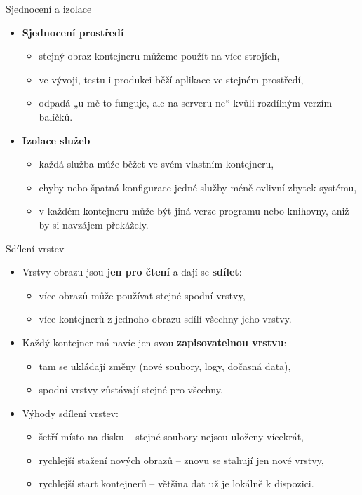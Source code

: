\documentclass{beamer}
\begin{document}
	\begin{frame}{Sjednocení a izolace}
		\begin{itemize}
			\item \textbf{Sjednocení prostředí}
			\begin{itemize}
				\item stejný obraz kontejneru můžeme použít na více strojích,
				\item ve vývoji, testu i produkci běží aplikace ve stejném prostředí,
				\item odpadá „u mě to funguje, ale na serveru ne“ kvůli rozdílným verzím balíčků.
			\end{itemize}
			
			\item \textbf{Izolace služeb}
			\begin{itemize}
				\item každá služba může běžet ve svém vlastním kontejneru,
				\item chyby nebo špatná konfigurace jedné služby méně ovlivní zbytek systému,
				\item v každém kontejneru může být jiná verze programu nebo knihovny,
				aniž by si navzájem překážely.
			\end{itemize}
		\end{itemize}
	\end{frame}

\begin{frame}{Sdílení vrstev}
	\begin{itemize}
		\item Vrstvy obrazu jsou \textbf{jen pro čtení} a dají se \textbf{sdílet}:
		\begin{itemize}
			\item více obrazů může používat stejné spodní vrstvy,
			\item více kontejnerů z jednoho obrazu sdílí všechny jeho vrstvy.
		\end{itemize}
		
		\item Každý kontejner má navíc jen svou \textbf{zapisovatelnou vrstvu}:
		\begin{itemize}
			\item tam se ukládají změny (nové soubory, logy, dočasná data),
			\item spodní vrstvy zůstávají stejné pro všechny.
		\end{itemize}
		
		\item Výhody sdílení vrstev:
		\begin{itemize}
			\item šetří místo na disku – stejné soubory nejsou uloženy vícekrát,
			\item rychlejší stažení nových obrazů – znovu se stahují jen nové vrstvy,
			\item rychlejší start kontejnerů – většina dat už je lokálně k dispozici.
		\end{itemize}
	\end{itemize}
\end{frame}
\end{document}
